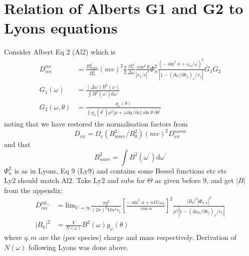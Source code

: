 \documentclass[]{article}
\begin{document}
\section{Relation of Alberts G1 and G2 to Lyons equations}
Consider Albert \cite{Albert2005} Eq 2 (Al2) which is
\begin{align}
D_{\alpha\alpha}^{nx} &= \frac{B_{wave}^2}{B_0^2}(mv)^2 \frac{\pi}{2}\frac{\Omega_c^2}{\Delta\omega}\frac{\cos^2\theta}{|v_\parallel/c|^3}  \Phi_n^2 \frac{(-\sin^2\alpha + \omega_n/\omega)^2}{|1-(\partial \omega/\partial k_\parallel)_x/v_\parallel |} G_1 G_2\\
G_1(\omega) &= \frac{(\Delta \omega)B^2(\omega)}{\int B^2(\omega^\prime) \mathrm{d} \omega^\prime}\\
G_2(\omega, \theta) &= \frac{g_\omega(\theta)}{\int g_\omega(\theta^\prime) \mu^2 | \mu + \omega \partial\mu/\partial\omega| \sin \theta^\prime \mathrm{d} \theta^\prime}\label{Alb_G_2}
\end{align}
noting that we have restored the normalisation factors from
\begin{equation}
D_{xx} = \Omega_c (B_{wave}^2/B_0^2)(mv)^2 D^{norm}_{xx}
\end{equation}
and that
\begin{equation}
B_{wave}^2 = \int B^2(\omega^\prime)\mathrm{d}\omega^\prime
\end{equation}
$\Phi_n^2$ is as in Lyons, Eq 9 (Ly9) and contains some Bessel functions etc etc\\
Ly2 should match Al2. Take Ly2 and subs for $\Theta$ as given before 9, and get $|B|$ from the appendix:
\begin{align}
D_{\alpha\alpha}^{nk_\perp} &= \mathrm{lim}_{V\rightarrow \infty} \frac{\pi q^2}{(2\pi)^2 V m^2 v_\parallel} \left[ \frac{-\sin^2\alpha + n \Omega/\omega_k}{\cos \alpha}\right]^2 \frac{ |B_k|^2 |\Phi_{n,k}|^2}{\mu^2 |1-(\partial \omega_k/\partial k_\parallel)_x/v_\parallel |}\\
|B_k|^2 &= \frac{V}{N(\omega)}B^2(\omega)g_\omega(\theta)
\end{align}
where $q, m$ are the (per species) charge and mass respectively. Derivation of $N(\omega)$ following Lyons was done above. 
\end{document}
